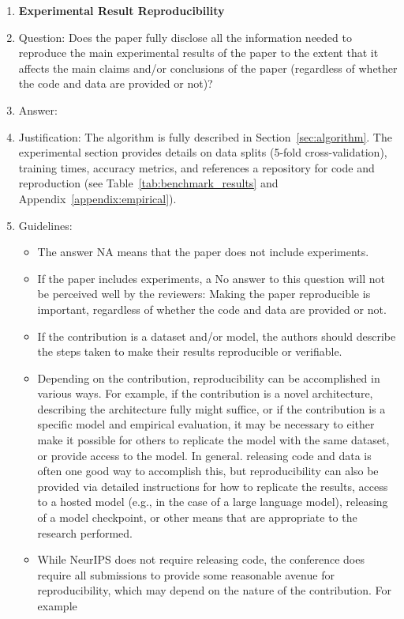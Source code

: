 \documentclass{article}
\begin{document}
\begin{enumerate}
    \item {\bf Experimental Result Reproducibility}
    \item[] Question: Does the paper fully disclose all the information needed to reproduce the main experimental results of the paper to the extent that it affects the main claims and/or conclusions of the paper (regardless of whether the code and data are provided or not)?
    \item[] Answer: \answerYes{}
    \item[] Justification: The algorithm is fully described in Section~\ref{sec:algorithm}. The experimental section provides details on data splits (5-fold cross-validation), training times, accuracy metrics, and references a repository for code and reproduction (see Table~\ref{tab:benchmark_results} and Appendix~\ref{appendix:empirical}).
    \item[] Guidelines:
    \begin{itemize}
        \item The answer NA means that the paper does not include experiments.
        \item If the paper includes experiments, a No answer to this question will not be perceived well by the reviewers: Making the paper reproducible is important, regardless of whether the code and data are provided or not.
        \item If the contribution is a dataset and/or model, the authors should describe the steps taken to make their results reproducible or verifiable. 
        \item Depending on the contribution, reproducibility can be accomplished in various ways. For example, if the contribution is a novel architecture, describing the architecture fully might suffice, or if the contribution is a specific model and empirical evaluation, it may be necessary to either make it possible for others to replicate the model with the same dataset, or provide access to the model. In general. releasing code and data is often one good way to accomplish this, but reproducibility can also be provided via detailed instructions for how to replicate the results, access to a hosted model (e.g., in the case of a large language model), releasing of a model checkpoint, or other means that are appropriate to the research performed.
        \item While NeurIPS does not require releasing code, the conference does require all submissions to provide some reasonable avenue for reproducibility, which may depend on the nature of the contribution. For example

\end{itemize}
\end{enumerate}
\end{document}
